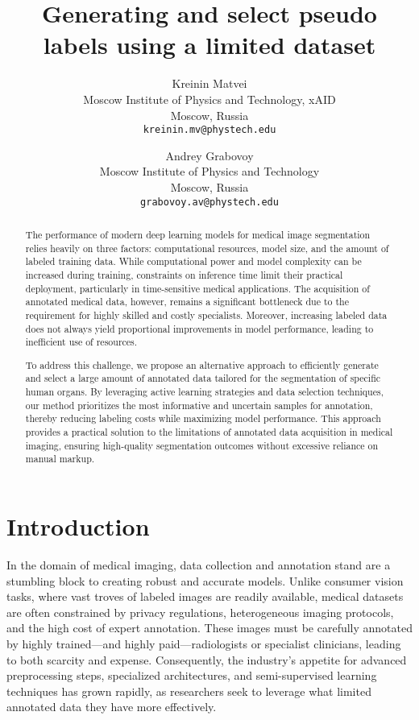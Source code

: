 \documentclass{article}
\title{Generating and select pseudo labels using a limited dataset}
\author{
  Kreinin Matvei \\
  Moscow Institute of Physics and Technology, xAID \\
  Moscow, Russia \\
  \texttt{kreinin.mv@phystech.edu} \\
    \and 
  Andrey Grabovoy \\
  Moscow Institute of Physics and Technology \\
  Moscow, Russia \\
  \texttt{grabovoy.av@phystech.edu}
}
\begin{document}
\maketitle
\begin{abstract}
The performance of modern deep learning models for medical image segmentation relies heavily on three factors: computational resources, model size, and the amount of labeled training data. While computational power and model complexity can be increased during training, constraints on inference time limit their practical deployment, particularly in time-sensitive medical applications. The acquisition of annotated medical data, however, remains a significant bottleneck due to the requirement for highly skilled and costly specialists. Moreover, increasing labeled data does not always yield proportional improvements in model performance, leading to inefficient use of resources.

To address this challenge, we propose an alternative approach to efficiently generate and select a large amount of annotated data tailored for the segmentation of specific human organs. By leveraging active learning strategies and data selection techniques, our method prioritizes the most informative and uncertain samples for annotation, thereby reducing labeling costs while maximizing model performance. This approach provides a practical solution to the limitations of annotated data acquisition in medical imaging, ensuring high-quality segmentation outcomes without excessive reliance on manual markup.
\end{abstract}



\section{Introduction}
In the domain of medical imaging, data collection and annotation stand are a stumbling block to creating robust and accurate models. Unlike consumer vision tasks, where vast troves of labeled images are readily available, medical datasets are often constrained by privacy regulations, heterogeneous imaging protocols, and the high cost of expert annotation. These images must be carefully annotated by highly trained—and highly paid—radiologists or specialist clinicians, leading to both scarcity and expense. Consequently, the industry’s appetite for advanced preprocessing steps, specialized architectures, and semi-supervised learning techniques has grown rapidly, as researchers seek to leverage what limited annotated data they have more effectively.
\end{document}

